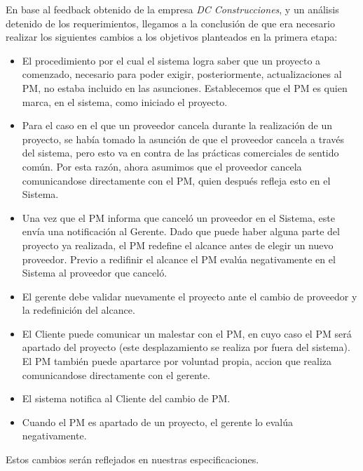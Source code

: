 En base al feedback obtenido de la empresa \textit{DC Construcciones}, y un análisis detenido de los requerimientos, llegamos a la conclusión de que era necesario realizar los siguientes cambios a los objetivos planteados en la primera etapa:

\begin{itemize}
  \item El procedimiento por el cual el sistema logra saber que un proyecto a comenzado, necesario para poder exigir, posteriormente, actualizaciones al PM, no estaba incluido en las asunciones. Establecemos que el PM es quien marca, en el sistema, como iniciado el proyecto.
  \item Para el caso en el que un proveedor cancela durante la realización de un proyecto, se había tomado la asunción de que el proveedor cancela a través del sistema, pero esto va en contra de las prácticas comerciales de sentido común. Por esta razón, ahora asumimos que el proveedor cancela comunicandose directamente con el PM, quien después refleja esto en el Sistema.
  \item Una vez que el PM informa que canceló un proveedor en el Sistema, este envía una notificación al Gerente. Dado que puede haber alguna parte del proyecto ya realizada, el PM redefine el alcance antes de elegir un nuevo proveedor. Previo a redifinir el alcance el PM evalúa negativamente en el Sistema al proveedor que canceló.
  \item El gerente debe validar nuevamente el proyecto ante el cambio de proveedor y la redefinición del alcance.
  \item El Cliente puede comunicar un malestar con el PM, en cuyo caso el PM será apartado del proyecto (este desplazamiento se realiza por fuera del sistema). El PM también puede apartarce por voluntad propia, accion que realiza comunicandose directamente con el gerente.
  \item El sistema notifica al Cliente del cambio de PM.
  \item Cuando el PM es apartado de un proyecto, el gerente lo evalúa negativamente.

\end{itemize}

Estos cambios serán reflejados en nuestras especificaciones.
